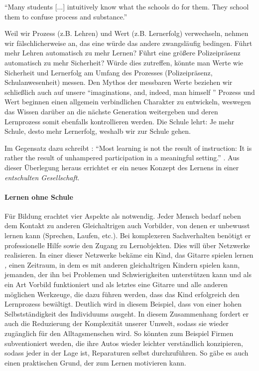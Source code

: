 \epigraph{
		``Many students [...] intuitively know what the schools do for them. They school them to confuse process and substance.''}
	{
		\parencite[3]{Illich-1971
	}

Weil wir Prozess (z.B. Lehren) und Wert (z.B. Lernerfolg) verwechseln, nehmen wir fälschlicherweise an, das eine würde das andere zwangsläufig bedingen.
Führt mehr Lehren automatisch zu mehr Lernen?
Führt eine größere Polizeipräsenz automatisch zu mehr Sicherheit?
Würde dies zutreffen, könnte man Werte wie Sicherheit und Lernerfolg am Umfang des Prozesses (Polizeipräsenz, Schulanwesenheit) messen.
Den Mythos der messbaren Werte beziehen wir schließlich auch auf unsere ``imaginations, and, indeed, man himself '' \parencite[19]{Illich-1971}
Prozess und Wert beginnen einen allgemein verbindlichen Charakter zu entwickeln, weswegen das Wissen darüber an die nächste Generation weitergeben und deren Lernprozess somit ebenfalls kontrollieren werden.
Die Schule lehrt: Je mehr Schule, desto mehr Lernerfolg, weshalb wir zur Schule gehen.

Im Gegensatz dazu schreibt \citeauthor{Illich-1971}:
``Most learning is not the result of instruction: It is rather the result of unhampered participation in a meaningful setting.'' \parencite[18]{Illich-1971}.
Aus dieser Überlegung heraus errichtet er ein neues Konzept des Lernens in einer \emph{entschulten Gesellschaft}.

\paragraph{Lernen ohne Schule}

Für Bildung erachtet \citeauthor{Illich-1971} vier Aspekte als notwendig.
Jeder Mensch bedarf neben dem Kontakt zu anderen Gleichaltrigen auch Vorbilder, von denen er unbewusst lernen kann (Sprechen, Laufen, etc.).
Bei komplexeren Sachverhalten benötigt er professionelle Hilfe sowie den Zugang zu Lernobjekten.
Dies will \citeauthor{Illich-1971} über Netzwerke realisieren.
In einer dieser Netzwerke bekäme ein Kind, das Gitarre spielen lernen \emph, einen Zeitraum, in dem es mit anderen gleichaltrigen Kindern spielen kann, jemanden, der ihn bei Problemen und Schwierigkeiten unterstützen kann und als ein Art Vorbild funktioniert und als letztes eine Gitarre und alle anderen möglichen Werkzeuge, die dazu führen werden, dass das Kind erfolgreich den Lernprozess bewältigt.
Deutlich wird in diesem Beispiel, dass \citeauthor{Illich-1971} von einer hohen Selbstständigkeit des Individuums ausgeht.
In diesem Zusammenhang fordert er auch die Reduzierung der Komplexität unserer Umwelt, sodass sie wieder zugänglich für den Alltagsmenschen wird.
So könnten zum Beispiel Firmen subventioniert werden, die ihre Autos wieder leichter verständlich konzipieren, sodass jeder in der Lage ist, Reparaturen selbst durchzuführen.
So gäbe es auch einen praktischen Grund, der zum Lernen motivieren kann.


}
